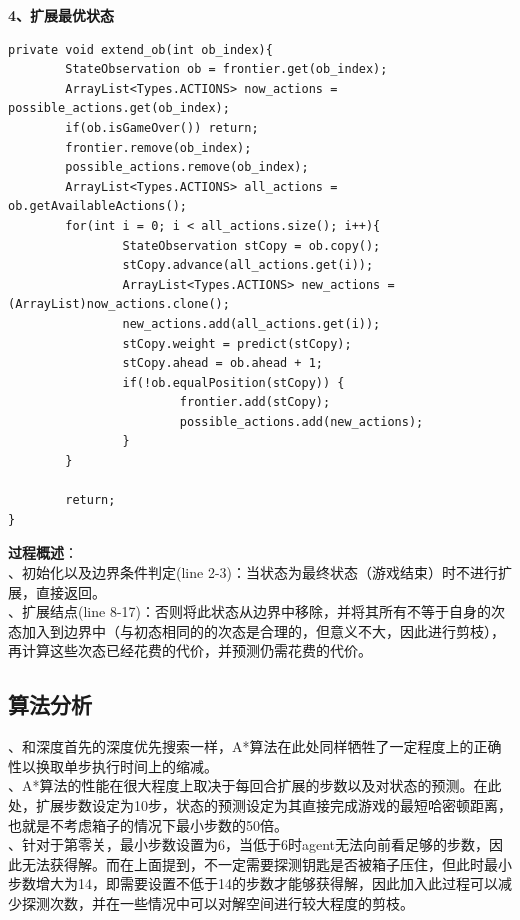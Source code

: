 \documentclass[UTF8]{article}
\begin{document}
\indent\textbf{4、扩展最优状态}
\begin{lstlisting}[caption=扩展最优状态]
private void extend_ob(int ob_index){
		StateObservation ob = frontier.get(ob_index);
		ArrayList<Types.ACTIONS> now_actions = possible_actions.get(ob_index);
		if(ob.isGameOver()) return;
		frontier.remove(ob_index);
		possible_actions.remove(ob_index);
		ArrayList<Types.ACTIONS> all_actions = ob.getAvailableActions();
		for(int i = 0; i < all_actions.size(); i++){
				StateObservation stCopy = ob.copy();
				stCopy.advance(all_actions.get(i));
				ArrayList<Types.ACTIONS> new_actions = (ArrayList)now_actions.clone();
				new_actions.add(all_actions.get(i));
				stCopy.weight = predict(stCopy);
				stCopy.ahead = ob.ahead + 1;       
				if(!ob.equalPosition(stCopy)) {
						frontier.add(stCopy);
						possible_actions.add(new_actions);
				}
		}
		
		return;
}
\end{lstlisting}
\indent\textbf{过程概述}：\\
、初始化以及边界条件判定(line 2-3)：当状态为最终状态（游戏结束）时不进行扩展，直接返回。\\
、扩展结点(line 8-17)：否则将此状态从边界中移除，并将其所有不等于自身的次态加入到边界中（与初态相同的的次态是合理的，但意义不大，因此进行剪枝），再计算这些次态已经花费的代价，并预测仍需花费的代价。

\subsection{算法分析}
、和深度首先的深度优先搜索一样，A*算法在此处同样牺牲了一定程度上的正确性以换取单步执行时间上的缩减。\\
、A*算法的性能在很大程度上取决于每回合扩展的步数以及对状态的预测。在此处，扩展步数设定为10步，状态的预测设定为其直接完成游戏的最短哈密顿距离，也就是不考虑箱子的情况下最小步数的50倍。\\
、针对于第零关，最小步数设置为6，当低于6时agent无法向前看足够的步数，因此无法获得解。而在上面提到，不一定需要探测钥匙是否被箱子压住，但此时最小步数增大为14，即需要设置不低于14的步数才能够获得解，因此加入此过程可以减少探测次数，并在一些情况中可以对解空间进行较大程度的剪枝。
\end{document}
